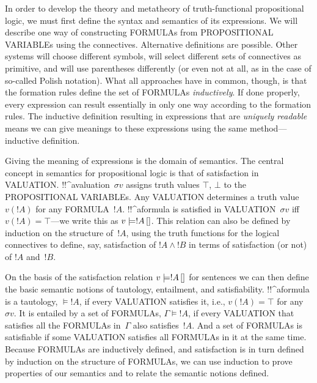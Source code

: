 \documentclass[10pt,a4paper]{article}
\newcommand*{\olup}[1]{\MakeUppercase{#1}}
\theoremstyle{plain}
\theoremstyle{definition}
\theoremstyle{remark}
\providecommand{\Entails}{\mathrel{\models}}
\providecommand{\True}{\top}
\providecommand{\False}{\bot}
\providecommand{\pValue}[1]{#1}
\providecommand{\pSat}[3]{#1 \models #2\,[#3]}
\providecommand{\pAssign}{\sigma}
\begin{document}
In order to develop the theory and metatheory of truth-functional
propositional logic, we must first define the syntax and semantics of
its expressions.  We will describe one way of constructing
\olup{formula}s from \olup{propositional variable}s using the connectives.
Alternative definitions are possible. Other systems will choose
different symbols, will select different sets of connectives as
primitive, and will use parentheses differently (or even not at all,
as in the case of so-called Polish notation).  What all approaches
have in common, though, is that the formation rules define the set of
\olup{formula}s \emph{inductively}. If done properly, every expression
can result essentially in only one way according to the formation
rules.  The inductive definition resulting in expressions that are
\emph{uniquely readable} means we can give meanings to these
expressions using the same method---inductive definition.

Giving the meaning of expressions is the domain of semantics.  The
central concept in semantics for propositional logic is that of
satisfaction in \olup{valuation}. !!^a{valuation}~$\pAssign{v}$ assigns
truth values $\True$, $\False$ to the \olup{propositional variable}s. Any
\olup{valuation} determines a truth value $\pValue{v}(!A)$ for any
\olup{formula}~$!A$.  !!^a{formula} is satisfied in
\olup{valuation}~$\pAssign{v}$ iff $\pValue{v}(!A) = \True$---we write
this as $\pSat{v}{!A}$. This relation can also be defined by induction on
the structure of~$!A$, using the truth functions for the logical
connectives to define, say, satisfaction of $!A \land !B$ in terms of
satisfaction (or not) of $!A$ and~$!B$.

On the basis of the satisfaction relation $\pSat{v}{!A}$ for sentences
we can then define the basic semantic notions of tautology,
entailment, and satisfiability.  !!^a{formula} is a tautology,
$\Entails !A$, if every \olup{valuation} satisfies it, i.e.,
$\pValue{v}(!A) = \True$ for any~$\pAssign{v}$. It is entailed by a
set of \olup{formula}s, $\Gamma \Entails !A$, if every \olup{valuation} that
satisfies all the \olup{formula}s in~$\Gamma$ also satisfies~$!A$. And a
set of \olup{formula}s is satisfiable if some \olup{valuation} satisfies all
\olup{formula}s in it at the same time.  Because \olup{formula}s are
inductively defined, and satisfaction is in turn defined by induction
on the structure of \olup{formula}s, we can use induction to prove
properties of our semantics and to relate the semantic notions
defined.
\end{document}

